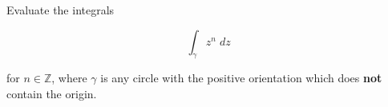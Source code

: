 Evaluate the integrals

$$
\int_{\gamma} z^n \; dz
$$

for $n \in \mathbb{Z}$, where $\gamma$ is any circle with the positive orientation which does \textbf{not} contain the 
origin.

\begin{solution}
    \ \\
\end{solution}